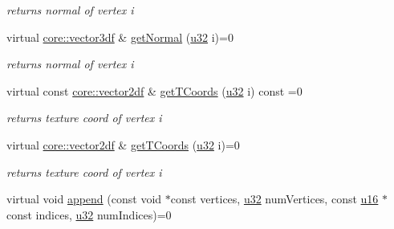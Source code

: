 \begin{DoxyCompactItemize}
\begin{DoxyCompactList}\small\item\em returns normal of vertex i \end{DoxyCompactList}\item 
\mbox{\label{classirr_1_1scene_1_1IMeshBuffer_ad6d76e91bbd61ee8084d5c9b64bb1239}} 
virtual \hyperlink{namespaceirr_1_1core_ae6e2b2a6c552833ebbd5b7463d03586b}{core\+::vector3df} \& \hyperlink{classirr_1_1scene_1_1IMeshBuffer_ad6d76e91bbd61ee8084d5c9b64bb1239}{get\+Normal} (\hyperlink{namespaceirr_a0416a53257075833e7002efd0a18e804}{u32} i)=0
\begin{DoxyCompactList}\small\item\em returns normal of vertex i \end{DoxyCompactList}\item 
\mbox{\label{classirr_1_1scene_1_1IMeshBuffer_a44e1fd7a1a3cb35492ebb556833514ed}} 
virtual const \hyperlink{namespaceirr_1_1core_a116f90bd31515724b6235014ee2b74d5}{core\+::vector2df} \& \hyperlink{classirr_1_1scene_1_1IMeshBuffer_a44e1fd7a1a3cb35492ebb556833514ed}{get\+T\+Coords} (\hyperlink{namespaceirr_a0416a53257075833e7002efd0a18e804}{u32} i) const =0
\begin{DoxyCompactList}\small\item\em returns texture coord of vertex i \end{DoxyCompactList}\item 
\mbox{\label{classirr_1_1scene_1_1IMeshBuffer_adf5f493e53fe6a23aa27c395527ea6ee}} 
virtual \hyperlink{namespaceirr_1_1core_a116f90bd31515724b6235014ee2b74d5}{core\+::vector2df} \& \hyperlink{classirr_1_1scene_1_1IMeshBuffer_adf5f493e53fe6a23aa27c395527ea6ee}{get\+T\+Coords} (\hyperlink{namespaceirr_a0416a53257075833e7002efd0a18e804}{u32} i)=0
\begin{DoxyCompactList}\small\item\em returns texture coord of vertex i \end{DoxyCompactList}\item 
virtual void \hyperlink{classirr_1_1scene_1_1IMeshBuffer_ac9e9d7fbb10175cc6f1596ba3fe4e8f9}{append} (const void $\ast$const vertices, \hyperlink{namespaceirr_a0416a53257075833e7002efd0a18e804}{u32} num\+Vertices, const \hyperlink{namespaceirr_ae9f8ec82692ad3b83c21f555bfa70bcc}{u16} $\ast$const indices, \hyperlink{namespaceirr_a0416a53257075833e7002efd0a18e804}{u32} num\+Indices)=0

\end{DoxyCompactItemize}
